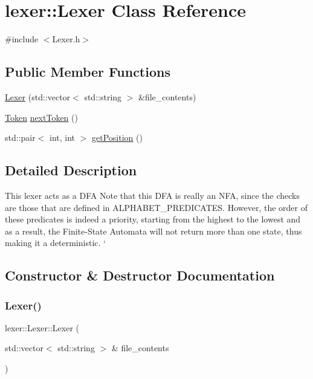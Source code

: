 \hypertarget{classlexer_1_1Lexer}{}\section{lexer\+:\+:Lexer Class Reference}
\label{classlexer_1_1Lexer}


{\ttfamily \#include $<$Lexer.\+h$>$}

\subsection*{Public Member Functions}
\begin{DoxyCompactItemize}
\item 
\hyperlink{classlexer_1_1Lexer_aa41e05a67869b1ff8a9980af4e6ceb69}{Lexer} (std\+::vector$<$ std\+::string $>$ \&file\+\_\+contents)
\item 
\hyperlink{classlexer_1_1Token}{Token} \hyperlink{classlexer_1_1Lexer_ab44ae44ee3256fbc79b33a63b3b9bcde}{next\+Token} ()
\item 
std\+::pair$<$ int, int $>$ \hyperlink{classlexer_1_1Lexer_add05c7c77f92ad5a8f91123ecebec71d}{get\+Position} ()
\end{DoxyCompactItemize}


\subsection{Detailed Description}
This lexer acts as a D\+FA Note that this D\+FA is really an N\+FA, since the checks are those that are defined in A\+L\+P\+H\+A\+B\+E\+T\+\_\+\+P\+R\+E\+D\+I\+C\+A\+T\+ES. However, the order of these predicates is indeed a priority, starting from the highest to the lowest and as a result, the Finite-\/\+State Automata will not return more than one state, thus making it a deterministic. ` 

\subsection{Constructor \& Destructor Documentation}
\mbox{\label{classlexer_1_1Lexer_aa41e05a67869b1ff8a9980af4e6ceb69}} 
\subsubsection{\texorpdfstring{Lexer()}{Lexer()}}
{\footnotesize\ttfamily lexer\+::\+Lexer\+::\+Lexer (\begin{DoxyParamCaption}\item[{std\+::vector$<$ std\+::string $>$ \&}]{file\+\_\+contents }\end{DoxyParamCaption})}

